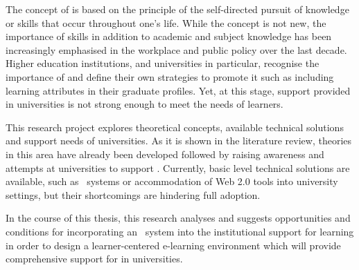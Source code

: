 The concept of \LLLs is based on the principle of the self-directed pursuit of
knowledge or skills that occur throughout one's life. While the concept is not
new, the importance of \LLLs skills in addition to academic and subject
knowledge has been increasingly emphasised in the workplace and public policy
over the last decade. Higher education institutions, and universities in
particular, recognise the importance of \LLLs and define their own strategies to
promote it such as including learning attributes in their graduate profiles.
Yet, at this stage, \LLLs support provided in universities is not strong enough
to meet the needs of learners.

This research project explores theoretical concepts, available technical
solutions and \LLLs support needs of universities. As it is shown in the
literature review, theories in this area have already been developed followed by
raising awareness and attempts at universities to support \LLLsn. Currently,
basic level technical solutions are available, such as \ep~systems or
accommodation of Web 2.0 tools into university settings, but their shortcomings
are hindering full adoption.

In the course of this thesis, this research analyses and suggests opportunities
and conditions for incorporating an \ep~system into the institutional support
for learning in order to design a learner-centered e-learning environment which
will provide comprehensive support for \LLLs in universities.
